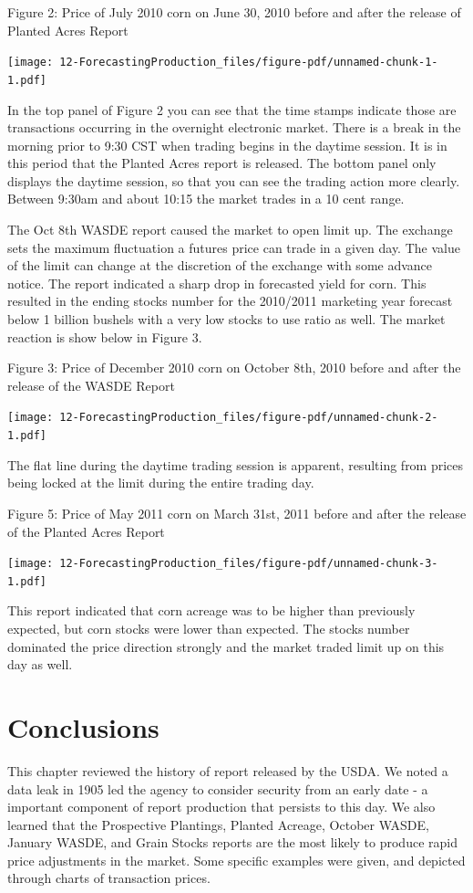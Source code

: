 \documentclass[
  letterpaper,
  DIV=11,
  numbers=noendperiod]{scrreprt}
\begin{document}
Figure 2: Price of July 2010 corn on June 30, 2010 before and after the
release of Planted Acres Report

\texttt{[image: 12-ForecastingProduction\_files/figure-pdf/unnamed-chunk-1-1.pdf]}

In the top panel of Figure 2 you can see that the time stamps indicate
those are transactions occurring in the overnight electronic market.
There is a break in the morning prior to 9:30 CST when trading begins in
the daytime session. It is in this period that the Planted Acres report
is released. The bottom panel only displays the daytime session, so that
you can see the trading action more clearly. Between 9:30am and about
10:15 the market trades in a 10 cent range.

The Oct 8th WASDE report caused the market to open limit up. The
exchange sets the maximum fluctuation a futures price can trade in a
given day. The value of the limit can change at the discretion of the
exchange with some advance notice. The report indicated a sharp drop in
forecasted yield for corn. This resulted in the ending stocks number for
the 2010/2011 marketing year forecast below 1 billion bushels with a
very low stocks to use ratio as well. The market reaction is show below
in Figure 3.

Figure 3: Price of December 2010 corn on October 8th, 2010 before and
after the release of the WASDE Report

\texttt{[image: 12-ForecastingProduction\_files/figure-pdf/unnamed-chunk-2-1.pdf]}

The flat line during the daytime trading session is apparent, resulting
from prices being locked at the limit during the entire trading day.

Figure 5: Price of May 2011 corn on March 31st, 2011 before and after
the release of the Planted Acres Report

\texttt{[image: 12-ForecastingProduction\_files/figure-pdf/unnamed-chunk-3-1.pdf]}

This report indicated that corn acreage was to be higher than previously
expected, but corn stocks were lower than expected. The stocks number
dominated the price direction strongly and the market traded limit up on
this day as well.

\section{Conclusions}\label{conclusions-1}

This chapter reviewed the history of report released by the USDA. We
noted a data leak in 1905 led the agency to consider security from an
early date - a important component of report production that persists to
this day. We also learned that the Prospective Plantings, Planted
Acreage, October WASDE, January WASDE, and Grain Stocks reports are the
most likely to produce rapid price adjustments in the market. Some
specific examples were given, and depicted through charts of transaction
prices.
\end{document}
